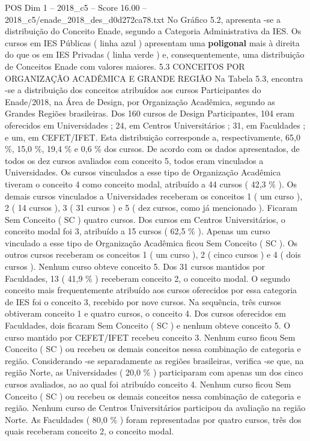 \begin{textsample}{POS Dim 1 – 2018\_c5 – Score 16.00 – 2018\_c5/enade\_2018\_des\_d0d272ca78.txt}
No Gráfico 5.2, apresenta -se a distribuição do Conceito Enade, segundo a Categoria Administrativa da IES.
Os cursos em IES Públicas ( linha azul ) apresentam uma \textbf{poligonal} mais à direita do que os em IES Privadas ( linha verde ) e, consequentemente, uma distribuição de Conceitos Enade com valores maiores. 5.3 CONCEITOS POR ORGANIZAÇÃO ACADÊMICA E GRANDE REGIÃO Na Tabela 5.3, encontra -se a distribuição dos conceitos atribuídos aos cursos Participantes do Enade/2018, na Área de Design, por Organização Acadêmica, segundo as Grandes Regiões brasileiras.
Dos 160 cursos de Design Participantes, 104 eram oferecidos em Universidades ; 24, em Centros Universitários ; 31, em Faculdades ; e um, em CEFET/IFET.
Esta distribuição corresponde a, respectivamente, 65,0 \%, 15,0 \%, 19,4 \% e 0,6 \% dos cursos.
De acordo com os dados apresentados, de todos os dez cursos avaliados com conceito 5, todos eram vinculados a Universidades.
Os cursos vinculados a esse tipo de Organização Acadêmica tiveram o conceito 4 como conceito modal, atribuído a 44 cursos ( 42,3 \% ).
Os demais cursos vinculados a Universidades receberam os conceitos 1 ( um curso ), 2 ( 14 cursos ), 3 ( 31 cursos ) e 5 ( dez cursos, como já mencionado ).
Ficaram Sem Conceito ( SC ) quatro cursos.
Dos cursos em Centros Universitários, o conceito modal foi 3, atribuído a 15 cursos ( 62,5 \% ).
Apenas um curso vinculado a esse tipo de Organização Acadêmica ficou Sem Conceito ( SC ).
Os outros cursos receberam os conceitos 1 ( um curso ), 2 ( cinco cursos ) e 4 ( dois cursos ).
Nenhum curso obteve conceito 5.
Dos 31 cursos mantidos por Faculdades, 13 ( 41,9 \% ) receberam conceito 2, o conceito modal.
O segundo conceito mais frequentemente atribuído aos cursos oferecidos por essa categoria de IES foi o conceito 3, recebido por nove cursos.
Na sequência, três cursos obtiveram conceito 1 e quatro cursos, o conceito 4.
Dos cursos oferecidos em Faculdades, dois ficaram Sem Conceito ( SC ) e nenhum obteve conceito 5.
O curso mantido por CEFET/IFET recebeu conceito 3.
Nenhum curso ficou Sem Conceito ( SC ) ou recebeu os demais conceitos nessa combinação de categoria e região.
Considerando -se separadamente as regiões brasileiras, verifica -se que, na região Norte, as Universidades ( 20,0 \% ) participaram com apenas um dos cinco cursos avaliados, ao ao qual foi atribuído conceito 4.
Nenhum curso ficou Sem Conceito ( SC ) ou recebeu os demais conceitos nessa combinação de categoria e região.
Nenhum curso de Centros Universitários participou da avaliação na região Norte.
As Faculdades ( 80,0 \% ) foram representadas por quatro cursos, três dos quais receberam conceito 2, o conceito modal.

\end{textsample}
